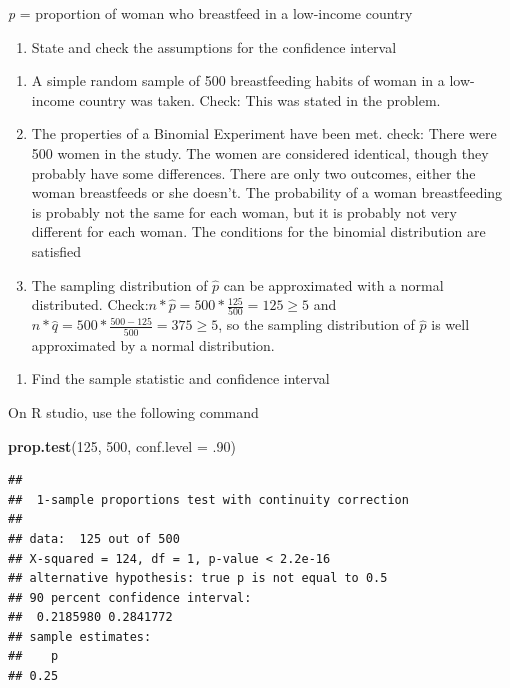 \documentclass[
]{book}
\newenvironment{Shaded}{\begin{snugshade}}{\end{snugshade}}
\newcommand{\DataTypeTok}[1]{\textcolor[rgb]{0.13,0.29,0.53}{#1}}
\newcommand{\DecValTok}[1]{\textcolor[rgb]{0.00,0.00,0.81}{#1}}
\newcommand{\FloatTok}[1]{\textcolor[rgb]{0.00,0.00,0.81}{#1}}
\newcommand{\KeywordTok}[1]{\textcolor[rgb]{0.13,0.29,0.53}{\textbf{#1}}}
\newcommand{\NormalTok}[1]{#1}
\providecommand{\tightlist}{%
  \setlength{\itemsep}{0pt}\setlength{\parskip}{0pt}}
\begin{document}
\emph{p} = proportion of woman who breastfeed in a low-income country

\begin{enumerate}
\def\labelenumi{\arabic{enumi}.}
\setcounter{enumi}{1}
\tightlist
\item
  State and check the assumptions for the confidence interval
\end{enumerate}

\begin{enumerate}
\def\labelenumi{\alph{enumi}.}
\item
  A simple random sample of 500 breastfeeding habits of woman in a low-income country was taken. Check: This was stated in the problem.
\item
  The properties of a Binomial Experiment have been met. check: There were 500 women in the study. The women are considered identical, though they probably have some differences. There are only two outcomes, either the woman breastfeeds or she doesn't. The probability of a woman breastfeeding is probably not the same for each woman, but it is probably not very different for each woman. The conditions for the binomial distribution are satisfied
\item
  The sampling distribution of \(\hat{p}\) can be approximated with a normal distributed. Check:\(n*\hat{p}= 500*\frac{125}{500}=125\ge5\) and \(n*\hat{q}=500*\frac{500-125}{500}=375\ge5\), so the sampling distribution of \(\hat{p}\) is well approximated by a normal distribution.
\end{enumerate}

\begin{enumerate}
\def\labelenumi{\arabic{enumi}.}
\setcounter{enumi}{3}
\tightlist
\item
  Find the sample statistic and confidence interval
\end{enumerate}

On R studio, use the following command

\begin{Shaded}
\begin{Highlighting}[]
\KeywordTok{prop.test}\NormalTok{(}\DecValTok{125}\NormalTok{, }\DecValTok{500}\NormalTok{, }\DataTypeTok{conf.level =} \FloatTok{.90}\NormalTok{)}
\end{Highlighting}
\end{Shaded}

\begin{verbatim}
## 
## 	1-sample proportions test with continuity correction
## 
## data:  125 out of 500
## X-squared = 124, df = 1, p-value < 2.2e-16
## alternative hypothesis: true p is not equal to 0.5
## 90 percent confidence interval:
##  0.2185980 0.2841772
## sample estimates:
##    p 
## 0.25
\end{verbatim}
\end{document}
